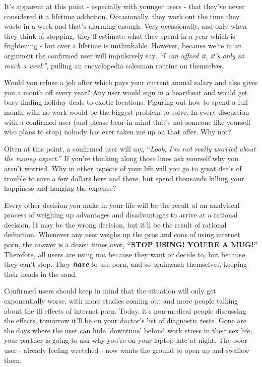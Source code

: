 \documentclass[
]{book}
\begin{document}
It's apparent at this point - especially with younger users - that they've never considered it a lifetime addiction. Occasionally, they work out the time they waste in a week and that's alarming enough. Very occasionally, and only when they think of stopping, they'll estimate what they spend in a year which is frightening - but over a lifetime is unthinkable. However, because we're in an argument the confirmed user will impulsively say, \emph{``I can afford it, it's only so much a week''}, pulling an encyclopedia salesman routine on themselves.

Would you refuse a job ofter which pays your current annual salary and also gives you a month off every year? Any user would sign in a heartbeat and would get busy finding holiday deals to exotic locations. Figuring out how to spend a full month with no work would be the biggest problem to solve. In every discussion with a confirmed user (and please bear in mind that's not someone like yourself who plans to stop) nobody has ever taken me up on that offer. Why not?

Often at this point, a confirmed user will say, ``\emph{Look, I'm not really worried about the money aspect.}'' If you're thinking along those lines ask yourself why you aren't worried. Why in other aspects of your life will you go to great deals of trouble to save a few dollars here and there, but spend thousands killing your happiness and hanging the expense?

Every other decision you make in your life will be the result of an analytical process of weighing up advantages and disadvantages to arrive at a rational decision. It may be the wrong decision, but it'll be the result of rational deduction. Whenever any user weighs up the pros and cons of using internet porn, the answer is a dozen times over, \textbf{``STOP USING! YOU'RE A MUG!''} Therefore, all users are using not because they want or decide to, but because they can't stop. They \textbf{\emph{have}} to use porn, and so brainwash themselves, keeping their heads in the sand.

Confirmed users should keep in mind that the situation will only get exponentially worse, with more studies coming out and more people talking about the ill effects of internet porn. Today, it's non-medical people discussing the effects, tomorrow it'll be on your doctor's list of diagnostic tests. Gone are the days where the user can hide 'downtime' behind work stress in their sex life, your partner is going to ask why you're on your laptop late at night. The poor user - already feeling wretched - now wants the ground to open up and swallow them.
\end{document}
